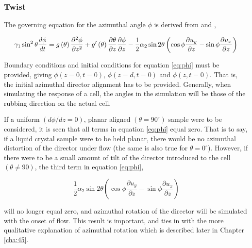 \subsubsection{Twist}
\label{sec:phi}

The governing equation for the azimuthal angle $\phi$ is derived from \cite{Cornford2008} and \cite{Stewart2004},

\begin{widetext}
\begin{equation}
\gamma_1 \sin^2\theta\frac{d\phi}{dt}=g\left(\theta\right)\frac{\partial^2\phi}{\partial z^2} + 
g'\left(\theta\right)\frac{\partial\theta}{\partial z}\frac{\partial\phi}{\partial z}- \\
\frac{1}{2}\alpha_2\sin2\theta\left(\cos\phi\frac{\partial u_y}{\partial z}-\sin\phi\frac{\partial u_x}{\partial z}\right)
\label{eq:phi}
\end{equation}
\end{widetext}

\noindent Boundary conditions and initial conditions for equation \ref{eq:phi} must be provided, giving $\phi\left(z=0,t=0\right)$, $\phi\left(z=d,t=0\right)$ and $\phi\left(z,t=0\right)$. That is, the initial azimuthal director alignment has to be provided. Generally, when simulating the response of a cell, the angles in the simulation will be those of the rubbing direction on the actual cell.

If a uniform $\left(d\phi/dz=0\right)$, planar aligned $\left(\theta=90^{\circ}\right)$ sample were to be considered, it is seen that all terms in equation \ref{eq:phi} equal zero. That is to say, if a liquid crystal sample were to be held planar, there would be no azimuthal distortion of the director under flow (the same is also true for $\theta=0^{\circ}$). However, if there were to be a small amount of tilt of the director introduced to the cell $\left(\theta\neq90\right)$, the third term in equation \ref{eq:phi},

\begin{equation}
\frac{1}{2}\alpha_2\sin2\theta\left(\cos\phi\frac{\partial u_y}{\partial z}-\sin\phi\frac{\partial u_x}{\partial z}\right)
\end{equation}

\noindent will no longer equal zero, and azimuthal rotation of the director will be simulated with the onset of flow. This result is important, and ties in with the more qualitative explanation of azimuthal rotation which is described later in Chapter \ref{cha:45}.


